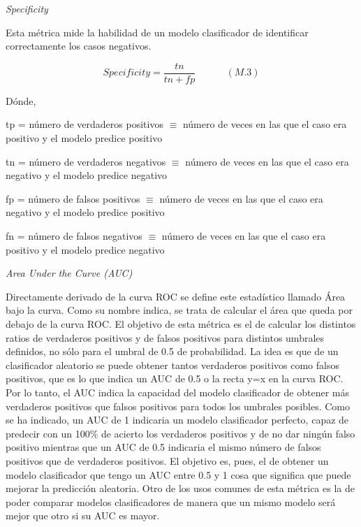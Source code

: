 \documentclass[]{DissertateUSU}
\begin{document}
\emph{Specificity}

\noindent Esta métrica mide la habilidad de un modelo clasificador de
identificar correctamente los casos negativos.

\[Specificity = \frac{tn}{tn+fp} \ \ \ \ \ \ \ \ \ \ \ \ \ \ (M.3)\]

\noindent Dónde,

\setlength\parskip{5ex}

\noindent tp = número de verdaderos positivos \(\equiv\) número de veces
en las que el caso era positivo y el modelo predice positivo

\noindent tn = número de verdaderos negativos \(\equiv\) número de veces
en las que el caso era negativo y el modelo predice negativo

\noindent fp = número de falsos positivos \(\equiv\) número de veces en
las que el caso era negativo y el modelo predice positivo

\noindent fn = número de falsos negativos \(\equiv\) número de veces en
las que el caso era positivo y el modelo predice negativo

\emph{Area Under the Curve (AUC)}

\noindent Directamente derivado de la curva ROC se define este
estadístico llamado Área bajo la curva. Como su nombre indica, se trata
de calcular el área que queda por debajo de la curva ROC. El objetivo de
esta métrica es el de calcular los distintos ratios de verdaderos
positivos y de falsos positivos para distintos umbrales definidos, no
sólo para el umbral de 0.5 de probabilidad. La idea es que de un
clasificador aleatorio se puede obtener tantos verdaderos positivos como
falsos positivos, que es lo que indica un AUC de 0.5 o la recta y=x en
la curva ROC. Por lo tanto, el AUC indica la capacidad del modelo
clasificador de obtener más verdaderos positivos que falsos positivos
para todos los umbrales posibles. Como se ha indicado, un AUC de 1
indicaria un modelo clasificador perfecto, capaz de predecir con un
100\% de acierto los verdaderos positivos y de no dar ningún falso
positivo mientras que un AUC de 0.5 indicaria el mismo número de falsos
positivos que de verdaderos positivos. El objetivo es, pues, el de
obtener un modelo clasificador que tengo un AUC entre 0.5 y 1 cosa que
significa que puede mejorar la predicción aleatoria. Otro de los usos
comunes de esta métrica es la de poder comparar modelos clasificadores
de manera que un mismo modelo será mejor que otro si su AUC es mayor.

\setlength\parskip{7ex}
\end{document}
